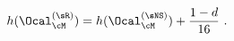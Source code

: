\begin{equation}
h(\Ocal^{(\sR)}_{\cM})=h(\Ocal^{(\sNS)}_{\cM})+{1-d \over 16}~.
\label{h OR ONS}\end{equation} 
